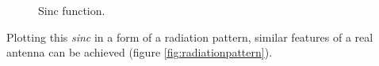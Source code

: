 \begin{figure}[H]
\hfill
{}
\hfill
{}
\hfill
\caption{Sinc function.}
\label{fig:sinc}
\end{figure}

Plotting this \textit{sinc} in a form of a radiation pattern, similar features of a real antenna can be achieved (figure \ref{fig:radiationpattern}).

